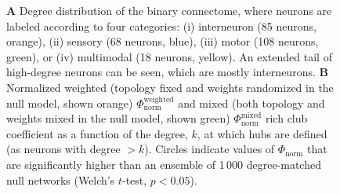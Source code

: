\documentclass[10pt,letterpaper]{article}
\begin{document}
{\begin{figure}[h]
    \caption{\textbf{A} Degree distribution of the binary connectome, where neurons are labeled according to four categories:
(i) interneuron (85 neurons, orange),
(ii) sensory (68 neurons, blue),
(iii) motor (108 neurons, green), or
(iv) multimodal (18 neurons, yellow).
An extended tail of high-degree neurons can be seen, which are mostly interneurons.
\textbf{B}
Normalized weighted (topology fixed and weights randomized in the null model, shown orange) $\Phi_\mathrm{norm}^\mathrm{weighted}$ and mixed (both topology and weights mixed in the null model, shown green) $\Phi_\mathrm{norm}^\mathrm{mixed}$ rich club coefficient as a function of the degree, $k$, at which hubs are defined (as neurons with degree $>k$).
Circles indicate values of $\Phi_\mathrm{norm}$ that are significantly higher than an ensemble of 1\,000 degree-matched null networks (Welch's $t$-test, $p < 0.05$).
\label{fig:S_weightedRC}
}
\end{figure} 








}
\end{document}
